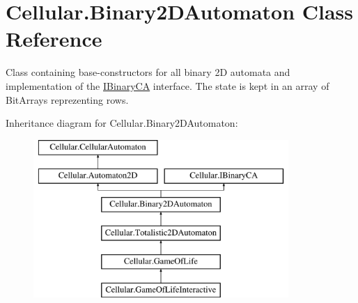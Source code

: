 \hypertarget{class_cellular_1_1_binary2_d_automaton}{}\section{Cellular.\+Binary2\+D\+Automaton Class Reference}
\label{class_cellular_1_1_binary2_d_automaton}


Class containing base-\/constructors for all binary 2\+D automata and implementation of the {\ttfamily \hyperlink{interface_cellular_1_1_i_binary_c_a}{I\+Binary\+C\+A}} interface. The state is kept in an array of {\ttfamily Bit\+Array}s reprezenting rows.  


Inheritance diagram for Cellular.\+Binary2\+D\+Automaton\+:\begin{figure}[H]
\begin{center}
\leavevmode
\includegraphics[height=6.000000cm]{class_cellular_1_1_binary2_d_automaton}
\end{center}
\end{figure}
